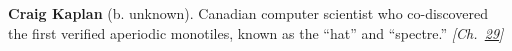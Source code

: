 \textbf{Craig Kaplan} (b. unknown). Canadian computer scientist who co-discovered the first verified aperiodic monotiles, known as the ``hat'' and ``spectre.'' \emph{[Ch.~\hyperref[ch:hatmonotile]{29}]}

